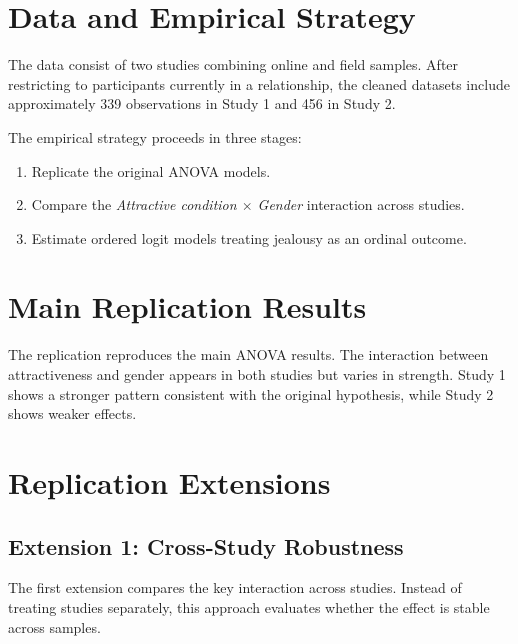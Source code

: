\documentclass[12pt]{article}
\begin{document}
	\section{Data and Empirical Strategy}
	The data consist of two studies combining online and field samples. After restricting to participants currently in a relationship, the cleaned datasets include approximately 339 observations in Study 1 and 456 in Study 2.
	
	The empirical strategy proceeds in three stages:
	\begin{enumerate}
		\item Replicate the original ANOVA models.
		\item Compare the \textit{Attractive condition $\times$ Gender} interaction across studies.
		\item Estimate ordered logit models treating jealousy as an ordinal outcome.
	\end{enumerate}
	
	\section{Main Replication Results}
	The replication reproduces the main ANOVA results. The interaction between attractiveness and gender appears in both studies but varies in strength. Study 1 shows a stronger pattern consistent with the original hypothesis, while Study 2 shows weaker effects.
	
	\begin{table}[h]
		\centering
		\caption{Replicated ANOVA Results}
		
	\end{table}
	
	\begin{table}[h]
		\centering
		\caption{Replicated ANOVA Results (Study 2)}
		
	\end{table}
	
	\section{Replication Extensions}
	
	\subsection{Extension 1: Cross-Study Robustness}
	The first extension compares the key interaction across studies. Instead of treating studies separately, this approach evaluates whether the effect is stable across samples.
	
\end{document}
